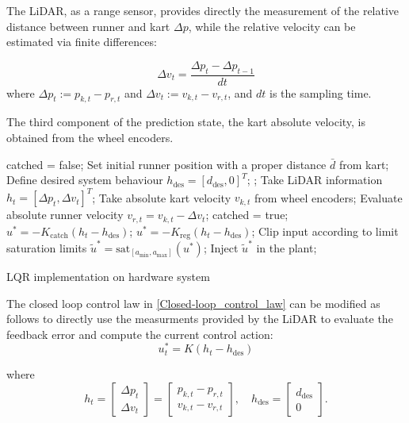 \documentclass[a4paper,12pt,oneside]{book}
\begin{document}
The LiDAR, as a range sensor, provides directly the measurement of the relative distance between runner and kart $\Delta p$, while the relative velocity can be estimated via finite differences:

\begin{equation}
	\Delta v_t = \frac{\Delta p_t - \Delta p_{t-1}} {dt}
\end{equation}
where $\Delta p_t := p_{k,t} - p_{r,t}$ and $\Delta v_t := v_{k,t} - v_ {r,t}$, and $dt$ is the sampling time.

The third component of the prediction state, the kart absolute velocity, is obtained from the wheel encoders.

\begin{algorithm}
\begin{algorithmic}[1]
	\State catched = false;
	\State Set initial runner position with a proper distance $\bar{d}$ from kart;
	\State Define desired system behaviour  $h_{\text{des}} = [d_{\text{des}}, 0]^T$;
	;
		\State Take LiDAR information $h_t = [\Delta p_t, \Delta v_t]^T$;
		\State Take absolute kart velocity $v_{k,t}$ from wheel encoders;
		\State Evaluate absolute runner velocity $v_{r,t} = v_{k,t} - \Delta v_t $;
			\State catched = true;
		\EndIf
			\State $u^* = - K_{\text{catch}} (h_t - h_{\text{des}}) $;
		\Else 
			\State $u^* = - K_{\text{reg}} (h_t - h_{\text{des}}) $;
		\EndIf
		\State Clip input according to limit saturation limits $\tilde{u}^* = \text{sat}_{[a_{\min}, a_{\max}]} (u^*)$;
		\State Inject $\tilde{u}^*$ in the plant;
	\EndFor
\caption{LQR implementation on hardware system}
\label{alg:LQR_hard_implementation}
\end{algorithmic}
\end{algorithm}

\bigskip
The closed loop control law in \ref{Closed-loop_control_law} can be modified as follows to directly use the measurments provided by the LiDAR to evaluate the feedback error and compute the current control action:
\begin{equation}
    u_t^* = K (h_t - h_{\text{des}})
\label{Closed-loop_control_law_sensors}
\end{equation}

where 
\begin{equation}
    h_t =
    \begin{bmatrix}
        \Delta p_t  \\
        \Delta v_t
    \end{bmatrix}
	=
    \begin{bmatrix}
        p_{k,t} - p_{r,t} \\
        v_{k,t} - v_{r,t}
    \end{bmatrix},
    \quad
    h_{\text{des}} =
    \begin{bmatrix}
        d_{\text{des}} \\
        0
    \end{bmatrix}.
\end{equation}
\end{document}
